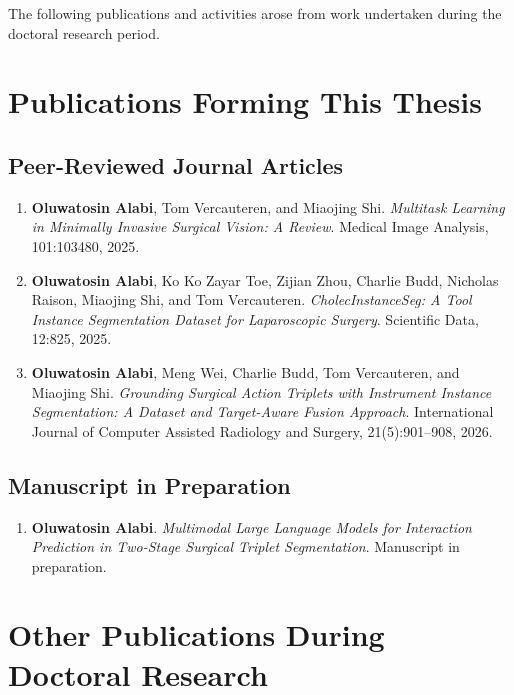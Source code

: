 The following publications and activities arose from work undertaken during the doctoral research period.

\section*{Publications Forming This Thesis}

\subsection*{Peer-Reviewed Journal Articles}

\begin{enumerate}
  \item \textbf{Oluwatosin Alabi}, Tom Vercauteren, and Miaojing Shi.
  \emph{Multitask Learning in Minimally Invasive Surgical Vision: A Review}.
  Medical Image Analysis, 101:103480, 2025.

  \item \textbf{Oluwatosin Alabi}, Ko Ko Zayar Toe, Zijian Zhou, Charlie Budd, Nicholas Raison, Miaojing Shi, and Tom Vercauteren.
  \emph{CholecInstanceSeg: A Tool Instance Segmentation Dataset for Laparoscopic Surgery}.
  Scientific Data, 12:825, 2025.

  \item \textbf{Oluwatosin Alabi}, Meng Wei, Charlie Budd, Tom Vercauteren, and Miaojing Shi.
  \emph{Grounding Surgical Action Triplets with Instrument Instance Segmentation: A Dataset and Target-Aware Fusion Approach}.
  International Journal of Computer Assisted Radiology and Surgery, 21(5):901--908, 2026.
\end{enumerate}

\subsection*{Manuscript in Preparation}

\begin{enumerate}
  \item \textbf{Oluwatosin Alabi}.
  \emph{Multimodal Large Language Models for Interaction Prediction in Two-Stage Surgical Triplet Segmentation}.
  Manuscript in preparation.
\end{enumerate}

\section*{Other Publications During Doctoral Research}

